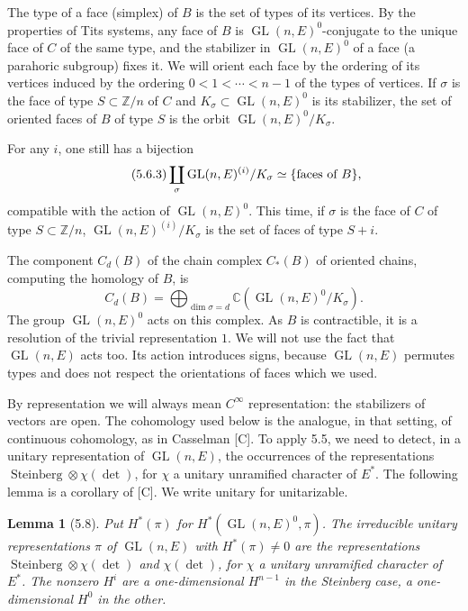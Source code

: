 \documentclass[10pt]{article}
\newcommand{\Z}{\mathbb Z}
\newcommand{\GL}{\operatorname{GL}}
\theoremstyle{deligne}
\newtheorem*{lemma*}{Lemma}
\newcommand{\Stein}{\operatorname{Steinberg}}
\newcommand{\heading}[1]{\vspace{0.7em}\noindent{\bfseries #1}\quad}
\begin{document}
The type of a face (simplex) of $B$ is the set of types of its vertices. By the properties of Tits systems, any face of $B$ is $\GL(n,E)^0$-conjugate to the unique face of $C$ of the same type, and the stabilizer in $\GL(n,E)^0$ of a face (a parahoric subgroup) fixes it. We will orient each face by the ordering of its vertices induced by the ordering $0<1<\cdots<n-1$ of the types of vertices. If $\sigma$ is the face of type $S\subset\Z/n$ of $C$ and $K_\sigma\subset\GL(n,E)^0$ is its stabilizer, the set of oriented faces of $B$ of type $S$ is the orbit $\GL(n,E)^0/K_\sigma$.

For any $i$, one still has a bijection
\begin{equation}\tag{5.6.3}
\coprod_\sigma \GL(n,E)^{(i)}/K_\sigma \simeq \{\hbox{faces of }B\},
\end{equation}
compatible with the action of $\GL(n,E)^0$. This time, if $\sigma$ is the face of $C$ of type $S\subset\Z/n$, $\GL(n,E)^{(i)}/K_\sigma$ is the set of faces of type $S+i$.

The component $C_d(B)$ of the chain complex $C_*(B)$ of oriented chains, computing the homology of $B$, is
\begin{equation}\tag{5.6.4}
C_d(B)=\bigoplus_{\dim\sigma=d}\mathbb C(\GL(n,E)^0/K_\sigma).
\end{equation}
The group $\GL(n,E)^0$ acts on this complex. As $B$ is contractible, it is a resolution of the trivial representation $1$. We will not use the fact that $\GL(n,E)$ acts too. Its action introduces signs, because $\GL(n,E)$ permutes types and does not respect the orientations of faces which we used.

\heading{5.7.} By representation we will always mean $C^\infty$ representation: the stabilizers of vectors are open. The cohomology used below is the analogue, in that setting, of continuous cohomology, as in Casselman [C]. To apply 5.5, we need to detect, in a unitary representation of $\GL(n,E)$, the occurrences of the representations $\Stein\otimes\chi(\det)$, for $\chi$ a unitary unramified character of $E^*$. The following lemma is a corollary of [C]. We write unitary for unitarizable.

\begin{lemma*}[5.8]
Put $H^*(\pi)$ for $H^*(\GL(n,E)^0,\pi)$. The irreducible unitary representations $\pi$ of $\GL(n,E)$ with $H^*(\pi)\ne0$ are the representations $\Stein\otimes\chi(\det)$ and $\chi(\det)$, for $\chi$ a unitary unramified character of $E^*$. The nonzero $H^i$ are a one-dimensional $H^{n-1}$ in the Steinberg case, a one-dimensional $H^0$ in the other.
\end{lemma*}
\end{document}
